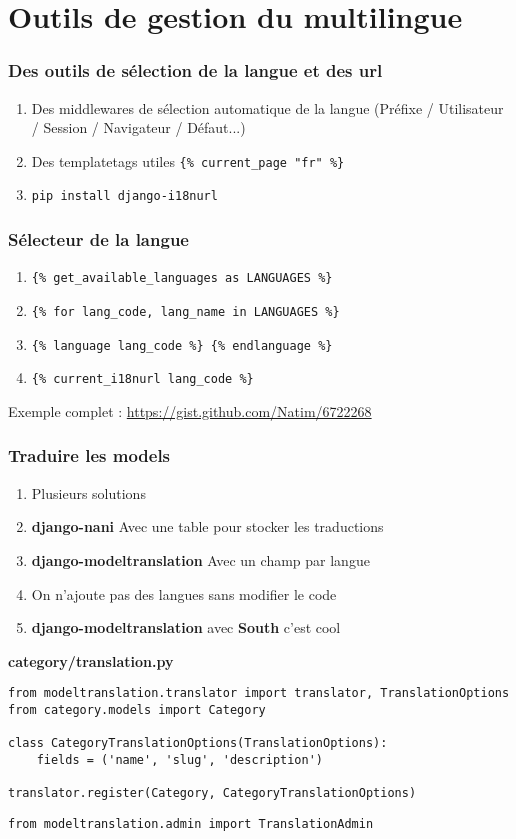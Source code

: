 \documentclass{beamer}
\begin{document}
\section{Outils de gestion du multilingue}

\begin{frame}
  \frametitle{Des outils de sélection de la langue et des url}
  \begin{enumerate}
    \item Des middlewares de sélection automatique de la langue (Préfixe / Utilisateur / Session / Navigateur / Défaut...)
    \pause \item Des templatetags utiles \pause \texttt{\{\% current\_page "fr" \%\}}
    \pause \item \texttt{pip install django-i18nurl}
  \end{enumerate}

\end{frame}

\begin{frame}[fragile]
  \frametitle{Sélecteur de la langue}
  \begin{enumerate}
    \item \texttt{\{\% get\_available\_languages as LANGUAGES \%\}}
    \pause \item \texttt{\{\% for lang\_code, lang\_name in LANGUAGES \%\}}
    \pause \item \texttt{\{\% language lang\_code \%\} \{\% endlanguage \%\}}
    \pause \item \texttt{\{\% current\_i18nurl lang\_code \%\}}
  \end{enumerate}
\pause
\vfill
  Exemple complet : \url{https://gist.github.com/Natim/6722268}
\vfill
\end{frame}

\begin{frame}[fragile]
  \frametitle{Traduire les models}
  \begin{enumerate}
    \item Plusieurs solutions
    \pause \item \textbf{django-nani} Avec une table pour stocker les traductions
    \pause \item \textbf{django-modeltranslation} Avec un champ par langue
    \pause \item On n'ajoute pas des langues sans modifier le code
    \pause \item \textbf{django-modeltranslation} avec \textbf{South} c'est cool
  \end{enumerate}
\pause
\textbf{category/translation.py}
\begin{lstlisting}
from modeltranslation.translator import translator, TranslationOptions
from category.models import Category

class CategoryTranslationOptions(TranslationOptions):
    fields = ('name', 'slug', 'description')

translator.register(Category, CategoryTranslationOptions)
\end{lstlisting}
\pause
\texttt{from modeltranslation.admin import TranslationAdmin}
\end{frame}
\end{document}

